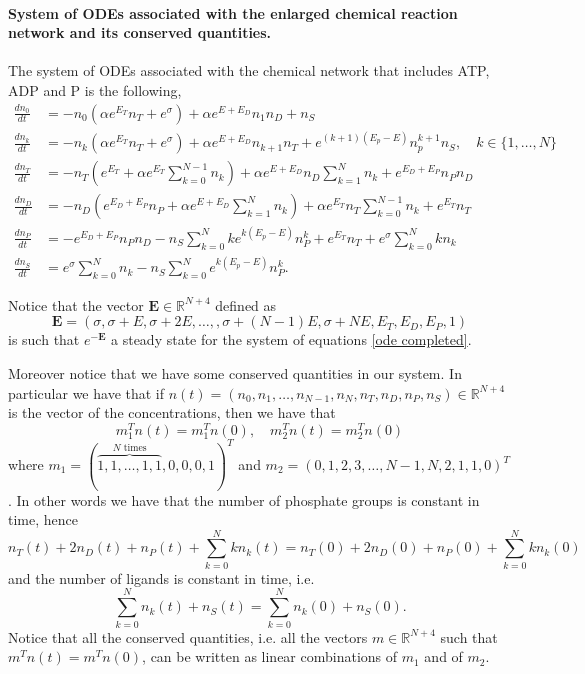 \documentclass{article}
\numberwithin{equation}{section}
\theoremstyle{plain}
\begin{document}
\paragraph{System of ODEs associated with the enlarged chemical reaction network and its conserved quantities.}
The system of ODEs associated with the chemical network that includes ATP, ADP and P is the following, 
\begin{align} \label{ode completed}
    \frac{d n_0 }{dt } &= - n_0 ( \alpha e^{E_T}  n_T + e^\sigma  ) + \alpha e^{ E+ E_D } n_{1} n_D + n_S \nonumber  \\
      \frac{d n_{k} }{dt } &= - n_{k} ( \alpha e^{E_T} n_T +  e^\sigma) + \alpha e^{ E+ E_D }n_{k+1} n_T + e^{(k+1)(E_p- E)} n_p^{k+1} n_S, \quad k \in \{ 1, \dots, N \} \nonumber \\
          \frac{d n_T }{dt } &= - n_T \left(e^{E_T} + \alpha e^{E_T} \sum_{k=0}^{N-1} n_k \right) + \alpha e^{ E+ E_D } n_D \sum_{k=1}^{N}n_{k}  + e^{ E_D+E_P } n_P n_D  \\ 
            \frac{d n_D }{dt } &= - n_D \left( e^{ E_D+E_P } n_P + \alpha e^{ E+ E_D } \sum_{k=1}^{N} n_{k} \right) + \alpha e^{E_T}  n_T \sum_{k=0}^{N-1}n_{k}  + e^{E_T} n_T  \nonumber \\ 
               \frac{d n_P }{dt } &= - e^{ E_D+E_P } n_P n_D - n_S  \sum_{k=0}^{N}  k e^{k (E_p - E)} n_P^k + e^{E_T} n_T + e^\sigma \sum_{k=0}^{N} k  n_k \nonumber \\ 
      \frac{d n_S}{dt }&= e^\sigma \sum_{k=0}^{N} n_k  - n_S  \sum_{k=0}^{N} e^{k (E_p - E)} n_P^k . \nonumber
      \end{align}

Notice that the vector $\textbf{E} \in \mathbb R^{N+4} $ defined as 
\[
\textbf{E} =(\sigma, \sigma + E, \sigma +2E, \dots ,  , \sigma + (N-1) E, \sigma + N  E, E_T , E_D, E_P , 1 )
\]
is such that $e^{ - \textbf{E}} $ a steady state for the system of equations \eqref{ode completed}. 

Moreover notice that we have some conserved quantities in our system. 
In particular we have that if $n(t)=(n_0, n_1, \dots, n_{N-1} , n_N, n_T, n_D, n_P, n_S ) \in \mathbb R^{N+ 4 } $ is the vector of the concentrations, then we have that 
\[
m_1^T n (t) = m_1^T n(0), \quad m_2^T n (t) = m_2^T n(0)
\]
where $m_1=(\overbrace{1,1,\dots, 1 ,1}^{ N \text{ times}},0,0,0,1)^T $ and $m_2 = (0,1,2, 3, \dots,N-1, N, 2,1 , 1,0 )^T $. 
In other words we have that the number of phosphate groups is constant in time, hence 
\[ 
n_T(t) +2 n_{D} (t)+ n_P (t)+ \sum_{k=0}^N k n_k(t)   = n_T (0)+2 n_{D} (0) + n_P (0) + \sum_{k=0}^N k n_k (0)
\] 
 and the number of ligands is constant in time, i.e. 
\[
\sum_{k=0}^N  n_{k} (t) + n_S  (t) = \sum_{k=0}^N  n_{k} (0) + n_S  (0). 
\] 
Notice that all the conserved quantities, i.e. all the vectors $m \in \mathbb R^{ N + 4} $ such that $m^T n (t) = m^T n(0)$, can be written as linear combinations of $m_1$ and of $m_2$. 
\end{document}
